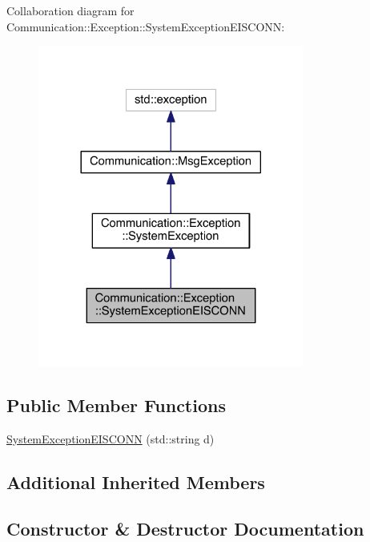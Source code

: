 Collaboration diagram for Communication\+:\+:Exception\+:\+:System\+Exception\+E\+I\+S\+C\+O\+N\+N\+:\nopagebreak
\begin{figure}[H]
\begin{center}
\leavevmode
\includegraphics[width=248pt]{class_communication_1_1_exception_1_1_system_exception_e_i_s_c_o_n_n__coll__graph}
\end{center}
\end{figure}
\subsection*{Public Member Functions}
\begin{DoxyCompactItemize}
\item 
\hyperlink{class_communication_1_1_exception_1_1_system_exception_e_i_s_c_o_n_n_a66be169a970e9c82726a4a6bd73bac9b}{System\+Exception\+E\+I\+S\+C\+O\+N\+N} (std\+::string d)
\end{DoxyCompactItemize}
\subsection*{Additional Inherited Members}


\subsection{Constructor \& Destructor Documentation}
\hypertarget{class_communication_1_1_exception_1_1_system_exception_e_i_s_c_o_n_n_a66be169a970e9c82726a4a6bd73bac9b}{}
